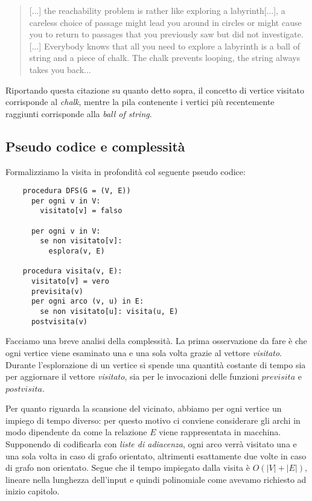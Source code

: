 \begin{quotation}
  [...] the reachability problem is rather like exploring a
  labyrinth[...], a careless choice of passage might lead you around
  in circles or might cause you to return to passages that you
  previously saw but did not investigate.[...] Everybody knows that
  all you need to explore a labyrinth is a ball of string and a piece
  of chalk. The chalk prevents looping, the string always takes you
  back...
\end{quotation}
Riportando questa citazione su quanto detto sopra, il concetto di
vertice visitato corrisponde al \emph{chalk}, mentre la pila
contenente i vertici pi\`u recentemente raggiunti corrisponde alla
\emph{ball of string}.

\subsection{Pseudo codice e complessit\`a}
Formalizziamo la visita in profondit\`a col seguente pseudo codice:
\begin{lstlisting}
    procedura DFS(G = (V, E))
      per ogni v in V:
        visitato[v] = falso

      per ogni v in V:
        se non visitato[v]:
          esplora(v, E)

    procedura visita(v, E):
      visitato[v] = vero
      previsita(v)
      per ogni arco (v, u) in E:
        se non visitato[u]: visita(u, E)
      postvisita(v)
\end{lstlisting}
Facciamo una breve analisi della complessit\`a. La prima osservazione
da fare \`e che ogni vertice viene esaminato una e una sola volta
grazie al vettore \emph{visitato}. Durante l'esplorazione di un
vertice si spende una quantit\`a costante di tempo sia per aggiornare
il vettore \emph{visitato}, sia per le invocazioni delle funzioni
$previsita$ e $postvisita$.

Per quanto riguarda la scansione del vicinato, abbiamo per ogni
vertice un impiego di tempo diverso: per questo motivo ci conviene
considerare gli archi in modo dipendente da come la relazione $E$
viene rappresentata in macchina. Supponendo di codificarla con
\emph{liste di adiacenza}, ogni arco verr\`a visitato una e una sola
volta in caso di grafo orientato, altrimenti esattamente due volte in
caso di grafo non orientato. Segue che il tempo impiegato dalla visita
\`e $O(|V| + |E|)$, lineare nella lunghezza dell'input e quindi
polinomiale come avevamo richiesto ad inizio capitolo.

